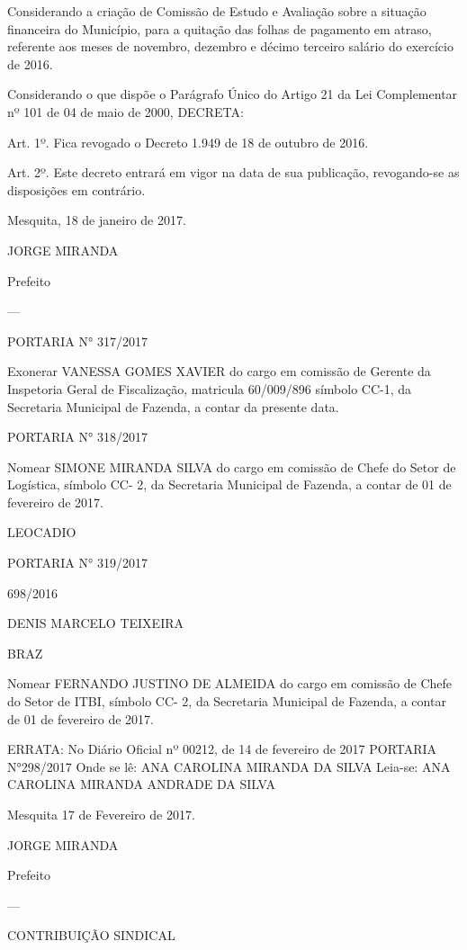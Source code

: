 \documentclass{doliberto}
\begin{document}
Considerando a criação de Comissão de Estudo e Avaliação 
sobre  a  situação  financeira  do  Município,  para  a  quitação 
das folhas de pagamento em atraso, referente aos meses de 
novembro, dezembro e décimo terceiro salário do exercício 
de 2016. 

Considerando o que dispõe o Parágrafo Único do Artigo 21 
da  Lei  Complementar  nº  101  de  04  de  maio  de  2000, 
DECRETA: 

Art. 1º. Fica revogado o Decreto 1.949 de 18 de outubro de 
2016. 

Art.  2º.  Este  decreto  entrará  em  vigor  na  data  de  sua 
publicação, revogando-se as disposições em contrário. 

Mesquita, 18 de janeiro de 2017. 

JORGE MIRANDA 

Prefeito 

---

PORTARIA N° 317/2017 

Exonerar VANESSA GOMES XAVIER do cargo em comissão 
de  Gerente  da  Inspetoria  Geral  de  Fiscalização, 
matricula  60/009/896  símbolo  CC-1,  da  Secretaria 
Municipal de Fazenda, a contar da presente data. 

PORTARIA N° 318/2017 

Nomear  SIMONE  MIRANDA  SILVA  do  cargo  em  comissão 
de  Chefe  do  Setor  de  Logística,  símbolo  CC-  2,  da 
Secretaria  Municipal  de  Fazenda,  a  contar  de  01  de 
fevereiro de 2017. 

LEOCADIO 

PORTARIA N° 319/2017 

698/2016 

DENIS  MARCELO  TEIXEIRA 

BRAZ 

Nomear  FERNANDO  JUSTINO  DE  ALMEIDA  do  cargo  em 
comissão  de  Chefe  do  Setor  de  ITBI,  símbolo  CC-  2,  da 
Secretaria  Municipal  de  Fazenda,  a  contar  de  01  de 
fevereiro de 2017. 

ERRATA: 
No Diário Oficial nº 00212, de 14 de fevereiro de 2017 
PORTARIA N°298/2017 
Onde se lê: 
ANA CAROLINA MIRANDA DA SILVA 
Leia-se: 
ANA CAROLINA MIRANDA ANDRADE DA SILVA 


Mesquita 17 de Fevereiro de 2017. 

JORGE MIRANDA 

Prefeito 

---

CONTRIBUIÇÃO SINDICAL 
\end{document}
